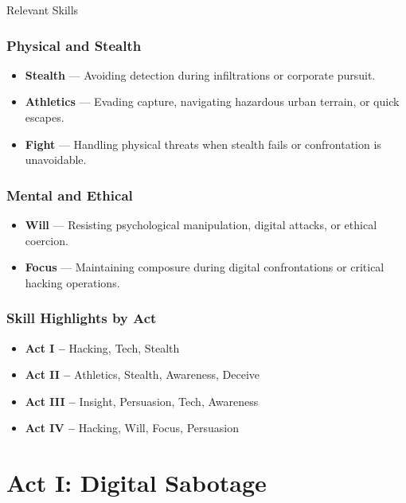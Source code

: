 \begin{CommentBox}{Relevant Skills}
    \subsubsection*{Physical and Stealth}
    \begin{itemize}
        \item \textbf{Stealth} — Avoiding detection during infiltrations or corporate pursuit.
        \item \textbf{Athletics} — Evading capture, navigating hazardous urban terrain, or quick escapes.
        \item \textbf{Fight} — Handling physical threats when stealth fails or confrontation is unavoidable.
    \end{itemize}

    \subsubsection*{Mental and Ethical}
    \begin{itemize}
        \item \textbf{Will} — Resisting psychological manipulation, digital attacks, or ethical coercion.
        \item \textbf{Focus} — Maintaining composure during digital confrontations or critical hacking operations.
    \end{itemize}

    \subsubsection*{Skill Highlights by Act}
    \begin{itemize}
        \item \textbf{Act I –} Hacking, Tech, Stealth
        \item \textbf{Act II –} Athletics, Stealth, Awareness, Deceive
        \item \textbf{Act III –} Insight, Persuasion, Tech, Awareness
        \item \textbf{Act IV –} Hacking, Will, Focus, Persuasion
    \end{itemize}    
\end{CommentBox}



\section{Act I: Digital Sabotage}

